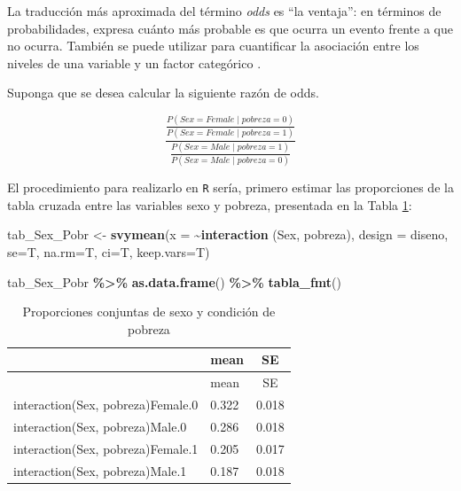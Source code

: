 \documentclass[
  spanish,
  12pt,
]{book}
\newenvironment{Shaded}{\begin{snugshade}}{\end{snugshade}}
\newcommand{\AttributeTok}[1]{\textcolor[rgb]{0.13,0.29,0.53}{#1}}
\newcommand{\FunctionTok}[1]{\textcolor[rgb]{0.13,0.29,0.53}{\textbf{#1}}}
\newcommand{\NormalTok}[1]{#1}
\newcommand{\OtherTok}[1]{\textcolor[rgb]{0.56,0.35,0.01}{#1}}
\newcommand{\SpecialCharTok}[1]{\textcolor[rgb]{0.81,0.36,0.00}{\textbf{#1}}}
\begin{document}
La traducción más aproximada del término \emph{odds} es ``la ventaja'': en términos de probabilidades, expresa cuánto más probable es que ocurra un evento frente a que no ocurra. También se puede utilizar para cuantificar la asociación entre los niveles de una variable y un factor categórico \citep{heeringa2017applied}.

Suponga que se desea calcular la siguiente razón de odds.

\[
 \frac{\frac{P(Sex = Female \mid pobreza = 0 )}{P(Sex = Female \mid pobreza = 1 )}}{
 \frac{P(Sex = Male \mid pobreza = 1 )}{P(Sex = Male \mid pobreza = 0 )}
 }
\]

El procedimiento para realizarlo en \texttt{R} sería, primero estimar las proporciones de la tabla cruzada entre las variables sexo y pobreza, presentada en la Tabla \ref{tab:tab-interaccion-sexo-pobreza}:

\begin{Shaded}
\begin{Highlighting}[]
\NormalTok{tab\_Sex\_Pobr }\OtherTok{\textless{}{-}} \FunctionTok{svymean}\NormalTok{(}\AttributeTok{x =} \SpecialCharTok{\textasciitilde{}}\FunctionTok{interaction}\NormalTok{ (Sex, pobreza), }\AttributeTok{design =}\NormalTok{ diseno, }
                        \AttributeTok{se=}\NormalTok{T, }\AttributeTok{na.rm=}\NormalTok{T, }\AttributeTok{ci=}\NormalTok{T, }\AttributeTok{keep.vars=}\NormalTok{T)}
\end{Highlighting}
\end{Shaded}

\begin{Shaded}
\begin{Highlighting}[]
\NormalTok{tab\_Sex\_Pobr }\SpecialCharTok{\%\textgreater{}\%} \FunctionTok{as.data.frame}\NormalTok{() }\SpecialCharTok{\%\textgreater{}\%}
  \FunctionTok{tabla\_fmt}\NormalTok{()}
\end{Highlighting}
\end{Shaded}

\begin{longtable}[]{@{}llc@{}}
\caption{\label{tab:tab-interaccion-sexo-pobreza}Proporciones conjuntas de sexo y condición de pobreza}\tabularnewline
\toprule\noalign{}
& mean & SE \\
\midrule\noalign{}
\endfirsthead
\toprule\noalign{}
& mean & SE \\
\midrule\noalign{}
\endhead
\bottomrule\noalign{}
\endlastfoot
interaction(Sex, pobreza)Female.0 & 0.322 & 0.018 \\
interaction(Sex, pobreza)Male.0 & 0.286 & 0.018 \\
interaction(Sex, pobreza)Female.1 & 0.205 & 0.017 \\
interaction(Sex, pobreza)Male.1 & 0.187 & 0.018 \\
\end{longtable}
\end{document}
